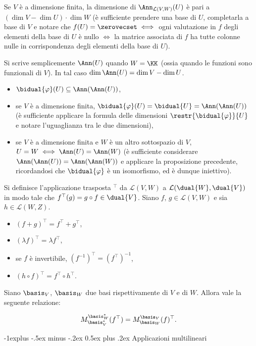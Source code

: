 \documentclass[10pt,landscape]{article}
\makeatletter
\renewcommand{\subsection}{\@startsection{subsection}{2}{0mm}%
	{-1explus -.5ex minus -.2ex}%
	{0.5ex plus .2ex}%
	{\normalfont\normalsize\bfseries}}
\makeatother
\begin{document}
\begin{multicols}{3}
		Se $V$ è a dimensione finita, la dimensione di
		$\Ann_{\mathcal{L}(V, W)}(U)$ è pari a $(\dim V - \dim U) \cdot \dim W$ (è sufficiente
		prendere una base di $U$, completarla a base di $V$ e
		notare che $f(U) = \zerovecset \iff$ ogni valutazione
		in $f$ degli elementi della base di $U$ è nullo $\iff$ la matrice
		associata di $f$ ha tutte colonne nulle in corrispondenza degli
		elementi della base di $U$).
		
		Si scrive semplicemente $\Ann(U)$ quando $W=\KK$ (ossia
		quando le funzioni sono funzionali di $V$). In tal
		caso $\dim \Ann(U) = \dim V - \dim U$.
		
		\begin{itemize}
			\item $\bidual{\varphi}(U) \subseteq \Ann(\Ann(U))$,
			\item se $V$ è a dimensione finita, $\bidual{\varphi}(U) = \bidual{U} = \Ann(\Ann(U))$ (è sufficiente
			applicare la formula delle dimensioni $\restr{\bidual{\varphi}}{U}$ e notare l'uguaglianza
			tra le due dimensioni),
			\item se $V$ è a dimensione finita e $W$ è un altro
			sottospazio di $V$,
			$U = W \iff \Ann(U) = \Ann(W)$ (è sufficiente
			considerare $\Ann(\Ann(U)) = \Ann(\Ann(W))$ e
			applicare la proposizione precedente, ricordandosi
			che $\bidual{\varphi}$ è un isomorfismo, ed è
			dunque iniettivo).
		\end{itemize}
		
		Si definisce l'applicazione trasposta $^\top$ da $\mathcal{L}(V, W)$ a
		$\mathcal{L}(\dual{W}, \dual{V})$ in modo tale che $f^\top(g)
		= g \circ f \in \dual{V}$. Siano $f$, $g \in \mathcal{L}(V,W)$ e
		sia $h \in \mathcal{L}(W,Z)$.
		
		\begin{itemize}
			\item $(f+g)^\top = f^\top + g^\top$,
			\item $(\lambda f)^\top = \lambda f^\top$,
			\item se $f$ è invertibile, $(f^{-1})^\top = (f^\top)^{-1}$,
			\item $(h \circ f)^\top = f^\top \circ h^\top$.
		\end{itemize}
		
		Siano $\basis_V$, $\basis_W$ due basi rispettivamente di $V$ e
		di $W$. Allora vale la seguente relazione:
		
		\[ M^{\basis_W^*}_{\basis_V^*}(f^\top) = M^{\basis_V}_{\basis_W}(f)^\top. \]
		
		\subsection{Applicazioni multilineari}
		

\end{multicols}
\end{document}
